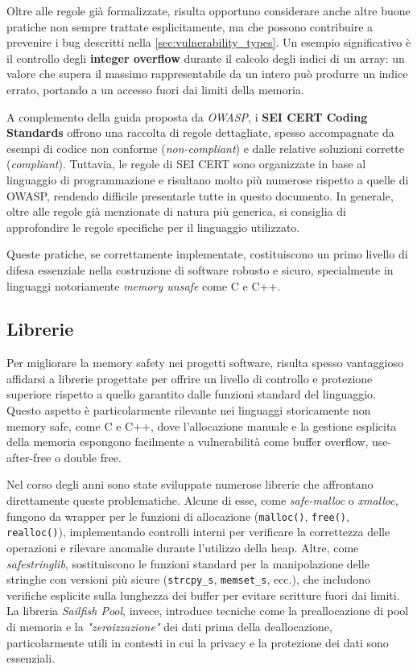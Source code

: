 Oltre alle regole già formalizzate, risulta opportuno considerare anche altre
buone pratiche non sempre trattate esplicitamente, ma che possono contribuire a prevenire
i bug descritti nella \autoref{sec:vulnerability_types}. Un esempio
significativo è il controllo degli \textbf{integer overflow} durante il calcolo degli
indici di un array: un valore che supera il massimo rappresentabile da un intero
può produrre un indice errato, portando a un accesso fuori dai limiti della memoria.

A complemento della guida proposta da \textit{OWASP}, i \textbf{SEI CERT Coding
Standards}\cite{cert_coding_standard} offrono una raccolta di regole dettagliate,
spesso accompagnate da esempi di codice non conforme (\textit{non-compliant}) e dalle
relative soluzioni corrette (\textit{compliant}). Tuttavia, le regole di SEI
CERT sono organizzate in base al linguaggio di programmazione e risultano molto
più numerose rispetto a quelle di OWASP, rendendo difficile presentarle tutte in
questo documento. In generale, oltre alle regole già menzionate di natura più generica,
si consiglia di approfondire le regole specifiche per il linguaggio utilizzato.

Queste pratiche, se correttamente implementate, costituiscono un primo livello
di difesa essenziale nella costruzione di software robusto e sicuro, specialmente
in linguaggi notoriamente \textit{memory unsafe} come C e C++.

\subsection{Librerie}
\label{sec:librerie}

Per migliorare la memory safety nei progetti software, risulta spesso
vantaggioso affidarsi a librerie progettate per offrire un livello di controllo
e protezione superiore rispetto a quello garantito dalle funzioni standard del
linguaggio. Questo aspetto è particolarmente rilevante nei linguaggi storicamente
non memory safe, come C e C++, dove l'allocazione manuale e la gestione esplicita
della memoria espongono facilmente a vulnerabilità come buffer overflow, use-after-free
o double free.

Nel corso degli anni sono state sviluppate numerose librerie che affrontano
direttamente queste problematiche. Alcune di esse, come \textit{safe-malloc} o \textit{xmalloc},
fungono da wrapper per le funzioni di allocazione (\texttt{malloc()}, \texttt{free()},
\texttt{realloc()}), implementando controlli interni per verificare la correttezza
delle operazioni e rilevare anomalie durante l'utilizzo della heap. Altre, come \textit{safestringlib},
sostituiscono le funzioni standard per la manipolazione delle stringhe con versioni
più sicure (\texttt{strcpy\_s}, \texttt{memset\_s}, ecc.), che includono verifiche
esplicite sulla lunghezza dei buffer per evitare scritture fuori dai limiti. La
libreria \textit{Sailfish Pool}, invece, introduce tecniche come la preallocazione
di pool di memoria e la \textit{"zeroizzazione"} dei dati prima della
deallocazione, particolarmente utili in contesti in cui la privacy e la protezione
dei dati sono essenziali.

